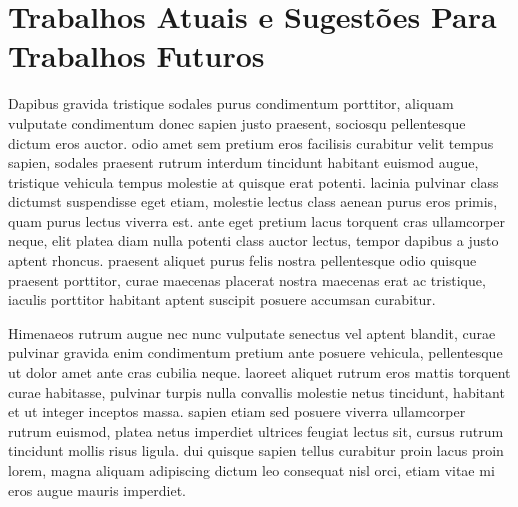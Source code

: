 	 

\section{Trabalhos Atuais e Sugestões Para Trabalhos Futuros}

Dapibus gravida tristique sodales purus condimentum porttitor, aliquam vulputate condimentum donec sapien justo praesent, sociosqu pellentesque dictum eros auctor. odio amet sem pretium eros facilisis curabitur velit tempus sapien, sodales praesent rutrum interdum tincidunt habitant euismod augue, tristique vehicula tempus molestie at quisque erat potenti. lacinia pulvinar class dictumst suspendisse eget etiam, molestie lectus class aenean purus eros primis, quam purus lectus viverra est. ante eget pretium lacus torquent cras ullamcorper neque, elit platea diam nulla potenti class auctor lectus, tempor dapibus a justo aptent rhoncus. praesent aliquet purus felis nostra pellentesque odio quisque praesent porttitor, curae maecenas placerat nostra maecenas erat ac tristique, iaculis porttitor habitant aptent suscipit posuere accumsan curabitur. 

	Himenaeos rutrum augue nec nunc vulputate senectus vel aptent blandit, curae pulvinar gravida enim condimentum pretium ante posuere vehicula, pellentesque ut dolor amet ante cras cubilia neque. laoreet aliquet rutrum eros mattis torquent curae habitasse, pulvinar turpis nulla convallis molestie netus tincidunt, habitant et ut integer inceptos massa. sapien etiam sed posuere viverra ullamcorper rutrum euismod, platea netus imperdiet ultrices feugiat lectus sit, cursus rutrum tincidunt mollis risus ligula. dui quisque sapien tellus curabitur proin lacus proin lorem, magna aliquam adipiscing dictum leo consequat nisl orci, etiam vitae mi eros augue mauris imperdiet.